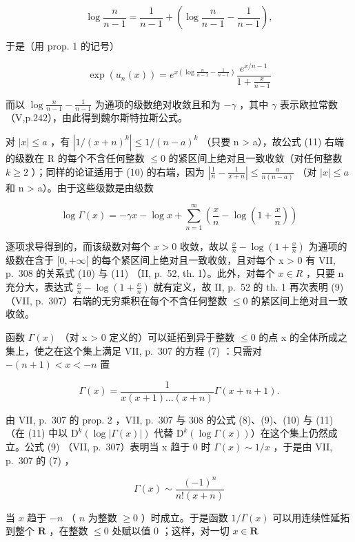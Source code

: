 \[
\log \frac {n}{n - 1} = \frac {1}{n - 1} + \left(\log \frac {n}{n - 1} - \frac {1}{n - 1}\right),
\]

于是（用 prop. 1 的记号）

\[
\exp (u _ {n} (x)) = e ^ {x \left(\log \frac {n}{n - 1} - \frac {1}{n - 1}\right)} \frac {e ^ {x / n - 1}}{1 + \frac {x}{n - 1}}
\]

而以 \(\log \frac{n}{n - 1} -\frac{1}{n - 1}\) 为通项的级数绝对收敛且和为 \(-\gamma\) ，其中 \(\gamma\) 表示欧拉常数（V,p.242），由此得到魏尔斯特拉斯公式。

对 \(|x| \leqslant a\) ，有 \(\left|1/(x+n)^{k}\right| \leqslant 1/(n-a)^{k}\) （只要 n \textgreater{} a），故公式 (11) 右端的级数在 R 的每个不含任何整数 \(\leqslant 0\) 的紧区间上绝对且一致收敛（对任何整数 \(k \geqslant 2\) ）；同样的论证适用于 (10) 的右端，因为 \(\left|\frac{1}{n}-\frac{1}{x+n}\right| \leqslant \frac{a}{n(n-a)}\) （对 \(|x| \leqslant a\) 和 n \textgreater{} a）。由于这些级数是由级数

\[
\log \Gamma (x) = - \gamma x - \log x + \sum_ {n = 1} ^ {\infty} \left(\frac {x}{n} - \log \left(1 + \frac {x}{n}\right)\right)
\]

逐项求导得到的，而该级数对每个 \(x > 0\) 收敛，故以 \(\frac{x}{n} - \log \left(1 + \frac{x}{n}\right)\) 为通项的级数在含于 \([0, +\infty[\) 的每个紧区间上绝对且一致收敛，且对每个 x \textgreater{} 0 有 VII, p.~308 的关系式 (10) 与 (11) （II, p.~52, th. 1）。此外，对每个 \(x \in R\) ，只要 n 充分大，表达式 \(\frac{x}{n} - \log\left(1 + \frac{x}{n}\right)\) 就有定义，故 II, p.~52 的 th. 1 再次表明 (9) （VII, p.~307）右端的无穷乘积在每个不含任何整数 \(\leqslant 0\) 的紧区间上绝对且一致收敛。

函数 \(\Gamma(x)\) （对 x \textgreater{} 0 定义的）可以延拓到异于整数 \(\leqslant 0\) 的点 x 的全体所成之集上，使之在这个集上满足 VII, p.~307 的方程 (7) ：只需对 \(-(n + 1) < x < -n\) 置

\[
\Gamma (x) = \frac {1}{x (x + 1) \ldots (x + n)} \Gamma (x + n + 1).
\]

由 VII, p.~307 的 prop. 2 ，VII, p.~307 与 308 的公式 (8)、(9)、(10) 与 (11) （在 (11) 中以 \(\mathrm{D}^{k}(\log|\Gamma(x)|)\) 代替 \(\mathrm{D}^{k}(\log\Gamma(x))\)）在这个集上仍然成立。公式 (9) （VII, p.~307）表明当 x 趋于 0 时 \(\Gamma(x)\sim1/x\) ，于是由 VII, p.~307 的 (7) ，

\[
\Gamma (x) \sim \frac {(- 1) ^ {n}}{n ! (x + n)}
\]

当 \(x\) 趋于 \(-n\) （ \(n\) 为整数 \(\geqslant 0\) ）时成立。于是函数 \(1 / \Gamma(x)\) 可以用连续性延拓到整个 \(\mathbf{R}\) ，在整数 \(\leqslant 0\) 处赋以值 0 ；这样，对一切 \(x \in \mathbf{R}\)

